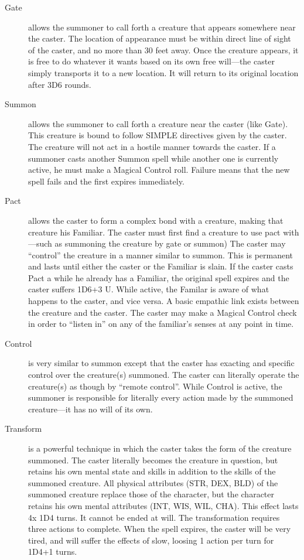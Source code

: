 \begin{description}
\item[Gate] allows the summoner to call forth a creature that appears
  somewhere near the caster.  The location of appearance must be
  within direct line of sight of the caster, and no more than 30 feet
  away.  Once the creature appears, it is free to do whatever it wants
  based on its own free will---the caster simply transports it to a
  new location.  It will return to its original location after 3D6
  rounds.

\item[Summon] allows the summoner to call forth a creature near the
  caster (like Gate).  This creature is bound to follow SIMPLE
  directives given by the caster.  The creature will not act in a
  hostile manner towards the caster.  If a summoner casts another
  Summon spell while another one is currently active, he must make a
  Magical Control roll.  Failure means that the new spell fails and
  the first expires immediately.

\item[Pact] allows the caster to form a complex bond with a creature,
  making that creature his Familiar.  The caster must first find a
  creature to use pact with---such as summoning the creature by gate
  or summon) The caster may ``control'' the creature in a manner
  similar to summon.  This is permanent and lasts until either the
  caster or the Familiar is slain.  If the caster casts Pact a while
  he already has a Familiar, the original spell expires and the caster
  suffers 1D6+3 U.  While active, the Familar is aware of what happens
  to the caster, and vice versa.  A basic empathic link exists between
  the creature and the caster.  The caster may make a Magical Control
  check in order to ``listen in'' on any of the familiar's senses at
  any point in time.

\item[Control] is very similar to summon except that the caster has
  exacting and specific control over the creature(s) summoned.  The
  caster can literally operate the creature(s) as though by ``remote
  control''.  While Control is active, the summoner is responsible for
  literally every action made by the summoned creature---it has no
  will of its own.

\item[Transform] is a powerful technique in which the caster takes the
  form of the creature summoned.  The caster literally becomes the
  creature in question, but retains his own mental state and skills in
  addition to the skills of the summoned creature.  All physical
  attributes (STR, DEX, BLD) of the summoned creature replace those of
  the character, but the character retains his own mental attributes
  (INT, WIS, WIL, CHA).  This effect lasts 4x 1D4 turns.  It cannot be
  ended at will.  The transformation requires three actions to
  complete.  When the spell expires, the caster will be very tired,
  and will suffer the effects of slow, loosing 1 action per turn for
  1D4+1 turns.


\end{description}
